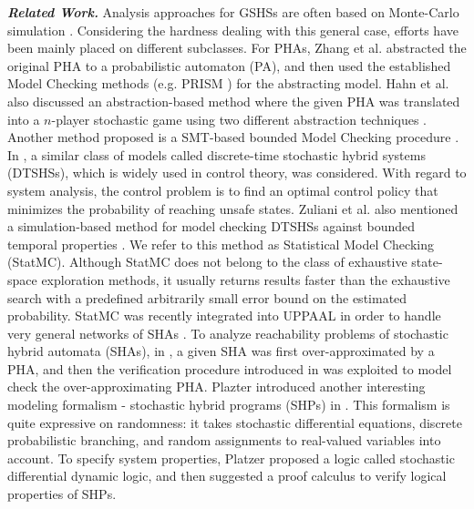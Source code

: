 {\it {\bf Related Work.}} Analysis approaches for GSHSs are often based on Monte-Carlo simulation \cite{blom2004particle}. Considering the hardness dealing with this general case, efforts have been mainly placed on different subclasses. For PHAs, Zhang et al. \cite{zhang2012safety} abstracted the original PHA to a probabilistic automaton (PA), and then used the established Model Checking methods (e.g. PRISM \cite{website:prism}) for the abstracting model. Hahn et al. also discussed an abstraction-based method where the given PHA was translated into a $n$-player stochastic game using two different abstraction techniques \cite{hahn2011game}. Another method proposed is a SMT-based bounded Model Checking procedure \cite{franzle2008stochastic}. In \cite{amin2006reachability, abate2007probabilistic, abate2011two, abate2011quantitative}, a similar class of models called discrete-time stochastic hybrid systems (DTSHSs), which is widely used in control theory, was considered. With regard to system analysis, the control problem is to find an optimal control policy that minimizes the probability of reaching unsafe states. Zuliani et al. also mentioned a simulation-based method for model checking DTSHSs against bounded temporal properties \cite{zuliani2010bayesian}. We refer to this method as Statistical Model Checking (StatMC).  Although StatMC does not belong to the class of exhaustive state-space exploration methods, it usually returns results faster than the exhaustive search with a predefined arbitrarily small error bound on the estimated probability. StatMC was recently integrated into UPPAAL \cite{larsen1997uppaal} in order to handle very general networks of SHAs \cite{david2012statistical}. To analyze reachability problems of stochastic hybrid automata (SHAs), in \cite{franzle2011measurability}, a given SHA was first over-approximated by a PHA, and then the verification procedure introduced in \cite{zhang2012safety} was exploited to model check the over-approximating PHA. Plazter introduced another interesting modeling formalism - stochastic hybrid programs (SHPs) in \cite{platzer2011stochastic}. This formalism is quite expressive on randomness: it takes stochastic differential equations, discrete probabilistic branching, and random assignments to real-valued variables into account. To specify system properties, Platzer proposed a logic called stochastic differential dynamic logic, and then suggested a proof calculus to verify logical properties of SHPs. 


